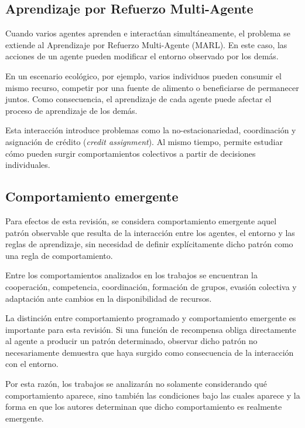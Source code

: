 \documentclass[conference]{IEEEtran}
\begin{document}
\subsection{Aprendizaje por Refuerzo Multi-Agente}

Cuando varios agentes aprenden e interactúan simultáneamente, el problema
se extiende al Aprendizaje por Refuerzo Multi-Agente (MARL). En este caso,
las acciones de un agente pueden modificar el entorno observado por los
demás.

En un escenario ecológico, por ejemplo, varios individuos pueden consumir
el mismo recurso, competir por una fuente de alimento o beneficiarse de
permanecer juntos. Como consecuencia, el aprendizaje de cada agente puede
afectar el proceso de aprendizaje de los demás.

Esta interacción introduce problemas como la no-estacionariedad,
coordinación y asignación de crédito (\textit{credit assignment}). Al
mismo tiempo, permite estudiar cómo pueden surgir comportamientos
colectivos a partir de decisiones individuales.

\subsection{Comportamiento emergente}

Para efectos de esta revisión, se considera comportamiento emergente
aquel patrón observable que resulta de la interacción entre los agentes,
el entorno y las reglas de aprendizaje, sin necesidad de definir
explícitamente dicho patrón como una regla de comportamiento.

Entre los comportamientos analizados en los trabajos se encuentran la
cooperación, competencia, coordinación, formación de grupos, evasión
colectiva y adaptación ante cambios en la disponibilidad de recursos.

La distinción entre comportamiento programado y comportamiento emergente
es importante para esta revisión. Si una función de recompensa obliga
directamente al agente a producir un patrón determinado, observar dicho
patrón no necesariamente demuestra que haya surgido como consecuencia de
la interacción con el entorno.

Por esta razón, los trabajos se analizarán no solamente considerando qué
comportamiento aparece, sino también las condiciones bajo las cuales
aparece y la forma en que los autores determinan que dicho comportamiento
es realmente emergente.

\end{document}
